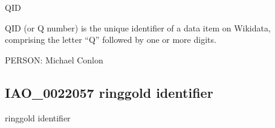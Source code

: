 \documentclass[letterpaper,10pt,english]{sphinxmanual}
\begin{document}
\begin{sphinxShadowBox}

\sphinxAtStartPar
QID

\sphinxAtStartPar
{}
\end{sphinxShadowBox}

\begin{sphinxShadowBox}

\sphinxAtStartPar
{\hyperref[\detokenize{doc-IAO_0000578::doc}]{}}
\end{sphinxShadowBox}

\begin{sphinxShadowBox}

\sphinxAtStartPar
QID (or Q number) is the unique identifier of a data item on Wikidata, comprising the letter “Q” followed by one or more digits.
\end{sphinxShadowBox}

\begin{sphinxShadowBox}

\sphinxAtStartPar
{}
\end{sphinxShadowBox}

\begin{sphinxShadowBox}

\sphinxAtStartPar
{}
\end{sphinxShadowBox}

\begin{sphinxShadowBox}

\sphinxAtStartPar
PERSON: Michael Conlon
\end{sphinxShadowBox}
\begin{quote}

\ignorespaces \end{quote}


\subsection{IAO\_0022057 \sphinxhyphen{} ringgold identifier}
\label{\detokenize{doc-IAO_0022057:iao-0022057-ringgold-identifier}}\label{\detokenize{doc-IAO_0022057:index-0}}\label{\detokenize{doc-IAO_0022057::doc}}
\begin{sphinxShadowBox}

\sphinxAtStartPar
ringgold identifier
\end{sphinxShadowBox}
\end{document}
